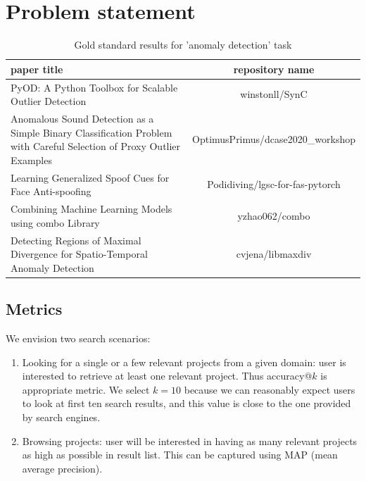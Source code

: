 \documentclass[longabstract,mgr,english]{iithesis}
\begin{document}
\chapter{Problem statement}

\begin{table}[hbt!]
\caption{Gold standard results for 'anomaly detection' task}
\begin{tabular}{|p{6cm}|c|}
\hline                                                                                                                paper title &                                repository name\\ \hline
\midrule
                                                                PyOD: A Python Toolbox for Scalable Outlier Detection &                      winstonll/SynC \\ \hline
 Anomalous Sound Detection as a Simple Binary Classification Problem with Careful Selection of Proxy Outlier Examples &    OptimusPrimus/dcase2020\_workshop \\ \hline
                                                               Learning Generalized Spoof Cues for Face Anti-spoofing &     Podidiving/lgsc-for-fas-pytorch \\ \hline
                                                                Combining Machine Learning Models using combo Library &                      yzhao062/combo \\ \hline
                                        Detecting Regions of Maximal Divergence for Spatio-Temporal Anomaly Detection &                    cvjena/libmaxdiv \\ \hline
\end{tabular}
\end{table}

\section{Metrics}

We envision two search scenarios:

\begin{enumerate}
\item Looking for a single or a few relevant projects from a given domain: user is interested to retrieve at least one relevant project. Thus accuracy@$k$ is appropriate metric. We select $k=10$ because we can reasonably expect users to look at first ten search results, and this value is close to the one provided by search engines.
\item Browsing projects: user will be interested in having as many relevant projects as high as possible in result list. This can be captured using MAP (mean average precision).
\end{enumerate}
\end{document}
